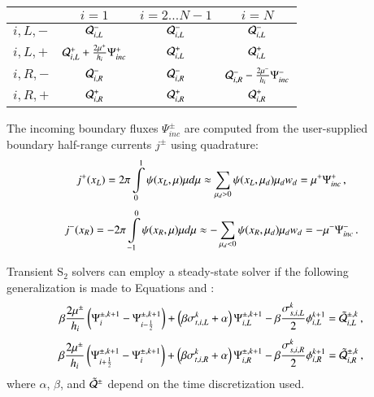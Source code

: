 \begin{center}
\begin{tabular}{|l||c|c|c|}\hline
          & $i=1$ & $i=2\ldots N-1$ & $i=N$\\\hline\hline
  $i,L,-$ & $\mathcal{Q}^-_{i,L}$
          & $\mathcal{Q}^-_{i,L}$
          & $\mathcal{Q}^-_{i,L}$ \\\hline
  $i,L,+$ & $\mathcal{Q}^+_{i,L} + \frac{2\mu^+}{h_i}\Psi^+_{inc}$
          & $\mathcal{Q}^+_{i,L}$
          & $\mathcal{Q}^+_{i,L}$ \\\hline
  $i,R,-$ & $\mathcal{Q}^-_{i,R}$
          & $\mathcal{Q}^-_{i,R}$
          & $\mathcal{Q}^-_{i,R} - \frac{2\mu^-}{h_i}\Psi^-_{inc}$ \\\hline
  $i,R,+$ & $\mathcal{Q}^+_{i,R}$
          & $\mathcal{Q}^+_{i,R}$
          & $\mathcal{Q}^+_{i,R}$ \\\hline
\end{tabular}
\end{center}
The incoming boundary fluxes $\Psi^\pm_{inc}$ are computed from the
user-supplied boundary half-range currents $j^\pm$ using quadrature:
\begin{equation}
   j^+(x_L) = 2\pi\int\limits_0^1 \psi(x_L,\mu)\mu d\mu
   \approx \sum\limits_{\mu_d>0}\psi(x_L,\mu_d)\mu_d w_d
   = \mu^+\Psi^+_{inc} \, ,
\end{equation}
\begin{equation}
   j^-(x_R) = -2\pi\int\limits_{-1}^0 \psi(x_R,\mu)\mu d\mu
   \approx -\sum\limits_{\mu_d<0}\psi(x_R,\mu_d)\mu_d w_d
   = -\mu^-\Psi^-_{inc} \, .
\end{equation}

Transient S$_2$ solvers can employ a steady-state solver if
the following generalization is made to Equations 
and :
\begin{equation}\lequ{S2trL}
  \beta\frac{2\mu^\pm}{h_i}\fn{\Psi^{\pm,k+1}_i - \Psi^{\pm,k+1}_{i-\half}}
  +\fn{\beta\sigma_{t,i,L}^k + \alpha}\Psi\iL^{\pm,k+1}
  -\beta\frac{\sigma_{s,i,L}^k}{2}\phi\iL^{k+1}
  =\tilde{\Q}_{i,L}^{\pm,k} \pec
\end{equation}
\begin{equation}\lequ{S2trR}
  \beta\frac{2\mu^\pm}{h_i}\fn{\Psi^{\pm,k+1}_{i+\half} - \Psi^{\pm,k+1}_i}
  +\fn{\beta\sigma_{t,i,R}^k + \alpha}\Psi\iR^{\pm,k+1}
  -\beta\frac{\sigma_{s,i,R}^k}{2}\phi\iR^{k+1}
  =\tilde{\Q}_{i,R}^{\pm,k} \pec
\end{equation}
where $\alpha$, $\beta$, and $\tilde{\mathcal{Q}}^\pm$ depend on the time
discretization used.
